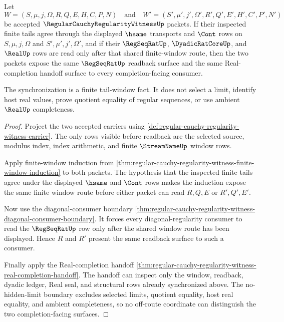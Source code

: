 \begin{theorem}
\label{thm:regular-cauchy-regularity-witness-tail-window-synchronization}
Let
$$
W=(S,\mu,j,\Omega,R,Q,E,H,C,P,N)
\quad\text{and}\quad
W'=(S',\mu',j',\Omega',R',Q',E',H',C',P',N')
$$
be accepted $\RegularCauchyRegularityWitnessUp$ packets. If their inspected finite tails agree through the displayed $\hsame$ transports and $\Cont$ rows on $S,\mu,j,\Omega$ and $S',\mu',j',\Omega'$, and if their $\RegSeqRatUp$, $\DyadicRatCoreUp$, and $\RealUp$ rows are read only after that shared finite-window route, then the two packets expose the same $\RegSeqRatUp$ readback surface and the same Real-completion handoff surface to every completion-facing consumer.

The synchronization is a finite tail-window fact. It does not select a limit, identify host real values, prove quotient equality of regular sequences, or use ambient $\RealUp$ completeness.
\end{theorem}
\begin{proof}
Project the two accepted carriers using \autoref{def:regular-cauchy-regularity-witness-carrier}. The only rows visible before readback are the selected source, modulus index, index arithmetic, and finite $\StreamNameUp$ window rows.

Apply finite-window induction from \autoref{thm:regular-cauchy-regularity-witness-finite-window-induction} to both packets. The hypothesis that the inspected finite tails agree under the displayed $\hsame$ and $\Cont$ rows makes the induction expose the same finite window route before either packet can read $R,Q,E$ or $R',Q',E'$.

Now use the diagonal-consumer boundary \autoref{thm:regular-cauchy-regularity-witness-diagonal-consumer-boundary}. It forces every diagonal-regularity consumer to read the $\RegSeqRatUp$ row only after the shared window route has been displayed. Hence $R$ and $R'$ present the same readback surface to such a consumer.

Finally apply the Real-completion handoff \autoref{thm:regular-cauchy-regularity-witness-real-completion-handoff}. The handoff can inspect only the window, readback, dyadic ledger, Real seal, and structural rows already synchronized above. The no-hidden-limit boundary excludes selected limits, quotient equality, host real equality, and ambient completeness, so no off-route coordinate can distinguish the two completion-facing surfaces.
\end{proof}


